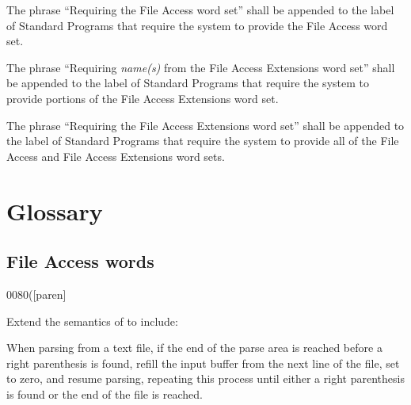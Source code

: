 The phrase ``Requiring the File Access word set'' shall be appended
to the label of Standard Programs that require the system to provide
the File Access word set.

The phrase ``Requiring \emph{name(s)} from the File Access Extensions
word set'' shall be appended to the label of Standard Programs that
require the system to provide portions of the File Access Extensions
word set.

The phrase ``Requiring the File Access Extensions word set'' shall be
appended to the label of Standard Programs that require the system to
provide all of the File Access and File Access Extensions word sets.


\section{Glossary} %

\subsection{File Access words} %

\begin{worddef}[p]{0080}{(}[paren]
\item {}

	Extend the semantics of  to include:

	When parsing from a text file, if the end of the parse area is
	reached before a right parenthesis is found, refill the input
	buffer from the next line of the file, set  to
	zero, and resume parsing, repeating this process until either a
	right parenthesis is found or the end of the file is reached.

	\begin{testing} %
	\end{testing}
\end{worddef}

